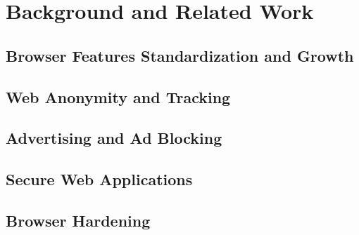\chapter{Background and Related Work}

\section{Browser Features Standardization and Growth}
\section{Web Anonymity and Tracking}
\section{Advertising and Ad Blocking}
\section{Secure Web Applications}
\section{Browser Hardening}